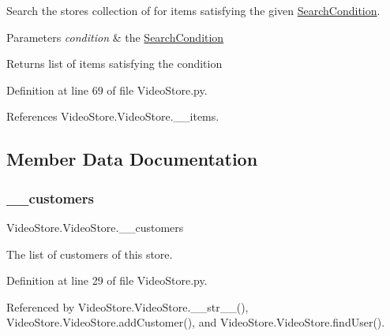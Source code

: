 Search the store\textquotesingle{}s collection of for items satisfying the given \hyperlink{namespaceSearchCondition}{Search\+Condition}. 


\begin{DoxyParams}{Parameters}
{\em condition} & the \hyperlink{namespaceSearchCondition}{Search\+Condition} \\
\hline
\end{DoxyParams}
\begin{DoxyReturn}{Returns}
list of items satisfying the condition 
\end{DoxyReturn}


Definition at line 69 of file Video\+Store.\+py.



References Video\+Store.\+Video\+Store.\+\_\+\+\_\+items.



\subsection{Member Data Documentation}
\mbox{\label{classVideoStore_1_1VideoStore_ab8f773ef96cc4f8aca5b845d9c32da0e}} 
\subsubsection{\texorpdfstring{\+\_\+\+\_\+customers}{\_\_customers}}
{\footnotesize\ttfamily Video\+Store.\+Video\+Store.\+\_\+\+\_\+customers\hspace{0.3cm}{\ttfamily [private]}}



The list of customers of this store. 



Definition at line 29 of file Video\+Store.\+py.



Referenced by Video\+Store.\+Video\+Store.\+\_\+\+\_\+str\+\_\+\+\_\+(), Video\+Store.\+Video\+Store.\+add\+Customer(), and Video\+Store.\+Video\+Store.\+find\+User().

\mbox{\label{classVideoStore_1_1VideoStore_a9b95fd49486fc2730c11920059fa1786}} 
